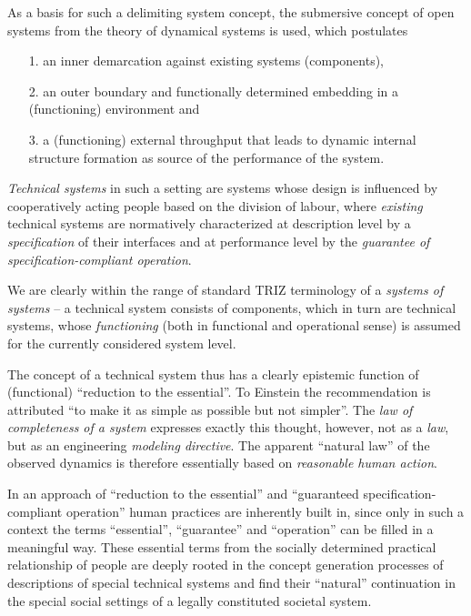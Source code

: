 \documentclass[11pt,a4paper]{article}
\begin{document}
As a basis for such a delimiting system concept, the submersive concept of
open systems from the theory of dynamical systems \cite{Bertalanffy1950} is
used, which postulates
\begin{itemize}[noitemsep]
\item [1.] an inner demarcation against existing systems (components),
\item [2.] an outer boundary and functionally determined embedding in a
  (functioning) environment and
\item [3.] a (functioning) external throughput that leads to dynamic internal
  structure formation as source of the performance of the system.
\end{itemize}

\emph{Technical systems} in such a setting are systems whose design is
influenced by cooperatively acting people based on the division of labour,
where \emph{existing} technical systems are normatively characterized at
description level by a \emph{specification} of their interfaces and at
performance level by the \emph{guarantee of specification-compliant
  operation}.

We are clearly within the range of standard TRIZ terminology of a
\emph{systems of systems} -- a technical system consists of components, which
in turn are technical systems, whose \emph{functioning} (both in functional
and operational sense) is assumed for the currently considered system level.

The concept of a technical system thus has a clearly epistemic function of
(functional) ``reduction to the essential''. To Einstein the recommendation is
attributed ``to make it as simple as possible but not simpler''. The \emph{law
  of completeness of a system} expresses exactly this thought, however, not as
a \emph{law}, but as an engineering \emph{modeling directive}. The apparent
``natural law'' of the observed dynamics is therefore essentially based on 
\emph{reasonable human action}.

In an approach of ``reduction to the essential'' and ``guaranteed
specification-compliant operation'' human practices are inherently built in,
since only in such a context the terms ``essential'', ``guarantee'' and
``operation'' can be filled in a meaningful way. These essential terms from
the socially determined practical relationship of people are deeply rooted in
the concept generation processes of descriptions of special technical systems
and find their ``natural'' continuation in the special social settings of a
legally constituted societal system.
\end{document}
